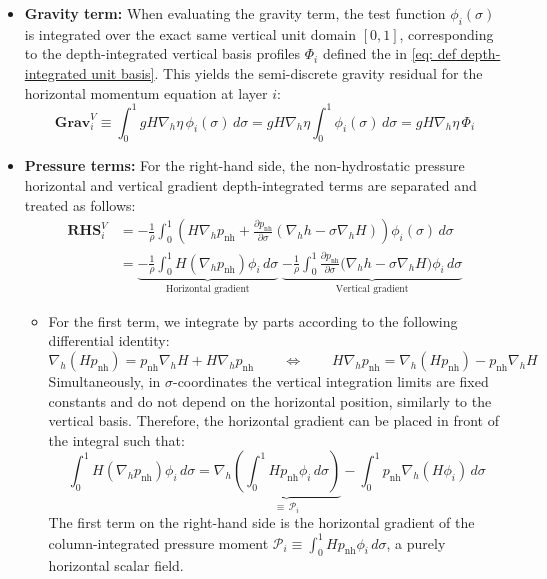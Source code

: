 \documentclass{article}
\newcommand{\nablah}{\nabla_h}
\newcommand{\pnh}{p_{\text{nh}}}
\newcommand{\dds}[1]{\frac{\partial #1}{\partial \sigma}}
\newcommand{\Pcol}{\mathcal{P}_i}
\begin{document}
\begin{itemize}
    \item \textbf{Gravity term:} When evaluating the gravity term, the test function $\phi_i(\sigma)$ is integrated over the exact same vertical unit domain $[0,1]$, corresponding to the depth-integrated vertical basis profiles $\Phi_i$ defined the in \eqref{eq: def depth-integrated unit basis}. 
    This yields the semi-discrete gravity residual for the horizontal momentum equation at layer $i$:
    \begin{equation}
        \mathbf{Grav}_i^V \equiv \int_0^1 gH\nablah\eta\,\phi_i(\sigma)\,d\sigma = gH\nablah\eta \int_0^1 \phi_i(\sigma)\,d\sigma = g H \nablah \eta\, \Phi_i
        \label{eq: horizontal momentum semi-discrete gravity residual}
    \end{equation}

    \item \textbf{Pressure terms:} For the right-hand side, the non-hydrostatic pressure horizontal and vertical gradient depth-integrated terms are separated and treated as follows:
    \begin{align*}
        \mathbf{RHS}_i^V &= -\frac{1}{\rho} \int_0^1 \left( H\nablah \pnh + \dds{\pnh}\left(\nablah h - \sigma \nablah H\right) \right)  \phi_i(\sigma) \, d\sigma \\[1mm]
        &= \underbrace{-\frac{1}{\rho} \int_0^1 H (\nablah \pnh) \phi_i \, d\sigma}_{\text{Horizontal gradient}} \; \underbrace{-\frac{1}{\rho} \int_0^1 \dds{\pnh}\Big(\nablah h - \sigma \nablah H\Big) \phi_i \, d\sigma}_{\text{Vertical gradient}}
    \end{align*}
    \begin{itemize}[label=$\diamond$]
        \item For the first term, we integrate by parts according to the following differential identity:
        $$\nablah (H \pnh) = \pnh \nablah H + H \nablah \pnh \qquad \Leftrightarrow \qquad H \nablah \pnh = \nablah (H \pnh) - \pnh \nablah H $$
        Simultaneously, in $\sigma$-coordinates the vertical integration limits are fixed constants and do not depend on the horizontal position, similarly to the vertical basis. 
        Therefore, the horizontal gradient can be placed in front of the integral such that:
        $$\int_0^1 H (\nablah \pnh) \phi_i \, d\sigma = \nablah \underbrace{\left( \int_0^1 H \pnh \phi_i \, d\sigma \right) }_{\equiv\, \Pcol} - \int_0^1 \pnh \nablah (H \phi_i) \, d\sigma$$
        The first term on the right-hand side is the horizontal gradient of the column-integrated pressure moment $\Pcol \equiv \int_0^1 H \pnh \phi_i \, d\sigma$, a purely horizontal scalar field.

\end{itemize}
\end{itemize}
\end{document}
